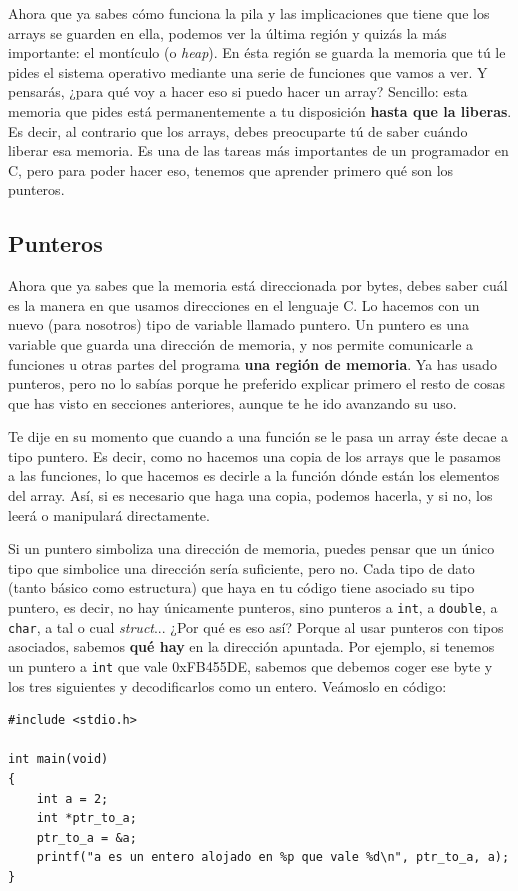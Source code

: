 \documentclass[a4paper]{article}
\begin{document}
Ahora que ya sabes cómo funciona la pila y las implicaciones que tiene que
los arrays se guarden en ella, podemos ver la última región y quizás la más
importante: el montículo (o \textit{heap}). En ésta región se guarda la memoria
que tú le pides el sistema operativo mediante una serie de funciones que vamos
a ver. Y pensarás, ¿para qué voy a hacer eso si puedo hacer un array? Sencillo:
esta memoria que pides está permanentemente a tu disposición \textbf{hasta que
la liberas}. Es decir, al contrario que los arrays, debes preocuparte tú de
saber cuándo liberar esa memoria. Es una de las tareas más importantes de
un programador en C, pero para poder hacer eso, tenemos que aprender primero
qué son los punteros.
\subsection{Punteros}
Ahora que ya sabes que la memoria está direccionada por bytes, debes saber cuál
es la manera en que usamos direcciones en el lenguaje C. Lo hacemos con un nuevo
(para nosotros) tipo de variable llamado puntero. Un puntero es
una variable que guarda una dirección de memoria, y nos permite comunicarle a
funciones u otras partes del programa \textbf{una región de memoria}.
Ya has usado punteros, pero no lo sabías porque he preferido explicar primero
el resto de cosas que has visto en secciones anteriores, aunque te he ido
avanzando su uso.

Te dije en su momento que cuando a una función se le pasa un array éste decae
a tipo puntero. Es decir, como no hacemos una copia de los arrays que le pasamos
a las funciones, lo que hacemos es decirle a la función dónde están los elementos
del array. Así, si es necesario que haga una copia, podemos hacerla, y si no,
los leerá o manipulará directamente.

Si un puntero simboliza una dirección de memoria, puedes pensar que un único
tipo que simbolice una dirección sería suficiente, pero no. Cada tipo de dato
(tanto básico como estructura) que haya en tu código tiene asociado su tipo
puntero, es decir, no hay únicamente punteros, sino punteros a \verb!int!, a
\verb!double!, a \verb!char!, a tal o cual \textit{struct}... ¿Por qué es eso
así? Porque al usar punteros con tipos asociados, sabemos \textbf{qué hay} en la
dirección apuntada. Por ejemplo, si tenemos un puntero a \verb!int! que vale
0xFB455DE, sabemos que debemos coger ese byte y los tres siguientes
y decodificarlos como un entero. Veámoslo en código:

\noindent
\begin{minipage}[H]{\linewidth}
\mbox{}
\begin{lstlisting}[style=C, label={lst:pointers1},
caption={Ejemplo de uso de punteros}]
#include <stdio.h>

int main(void)
{
    int a = 2;
    int *ptr_to_a;
    ptr_to_a = &a;
    printf("a es un entero alojado en %p que vale %d\n", ptr_to_a, a);
}
\end{lstlisting}
\end{minipage}
\end{document}
